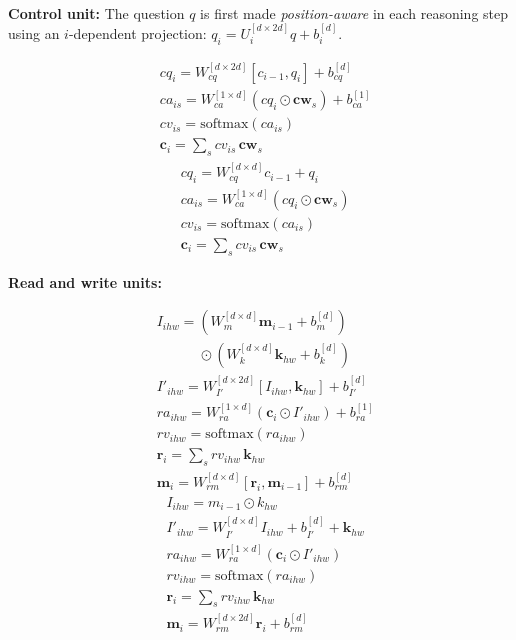 \documentclass[final,paperwidth=36in,paperheight=48in,portrait,fontscale=0.36]{baposter}
\newcommand{\cw}{\mathbf{cw}}
\newcommand{\cc}{\mathbf{c}}
\newcommand{\kb}{\mathbf{k}}
\newcommand{\mem}{\mathbf{m}}
\newcommand{\rr}{\mathbf{r}}
\begin{document}
\begin{poster}
{\\
\noindent\textbf{Control unit:} The question $q$ is first made \emph{position-aware} in each reasoning step using an $i$-dependent projection: $q_i = U_i^{[d \times 2d]} q + b_i^{[d]}$.


\begin{multicols}{2}
	\noindent
	\begin{align*}
	&cq_i = W_{cq}^{[d \times 2d]} [c_{i-1}, q_i] + b_{cq}^{[d]}  \tag{c1} \\
	&ca_{is} = W_{ca}^{[1 \times d]} (cq_i \odot \cw_s) + b_{ca}^{[1]}
	\tag{c2.1}\\
	&cv_{is} = \textrm{softmax}(ca_{is}) \tag{c2.2}\\
	&\cc_i = \sum_s cv_{is} \, \cw_s  \tag{c2.3}
	\end{align*}
	\columnbreak
	{
		\begin{align*}
		&cq_i = W_{cq}^{[d \times d]} c_{i-1} + q_i  \tag{c1} \\
		&ca_{is} = W_{ca}^{[1 \times d]} (cq_i \odot \cw_s)  \tag{c2.1}\\
		&cv_{is} = \textrm{softmax}(ca_{is}) \tag{c2.2}\\
		&\cc_i = \sum_s cv_{is} \, \cw_s  \tag{c2.3}
		\end{align*}}
\end{multicols}

\vskip -0.6cm

\noindent\textbf{Read and write units:}
\begin{multicols}{2}
	\noindent
	\begin{align*}
	&I_{ihw} = (W_{m}^{[d \times d]} \mem_{i-1} + b_{m}^{[d]}) \\
	& \qquad \quad \odot (W_{k}^{[d \times d]} \kb_{hw} + b_{k}^{[d]}) \tag{r1} \\
	&I'_{ihw} =  W_{I'}^{[d \times 2d]} [I_{ihw},\kb_{hw}]  + b_{I'}^{[d]}  \tag{r2} \\
	&ra_{ihw} = W_{ra}^{[1 \times d]} (\cc_i \odot I'_{ihw}) + b_{ra}^{[1]} \tag{r3.1}\\
	&rv_{ihw} = \textrm{softmax}(ra_{ihw}) \tag{r3.2}\\
	&\rr_i = \sum_s rv_{ihw} \, \kb_{hw}  \tag{r3.3}\\
	&\mem_i = W_{rm}^{[d \times d]} [\rr_i, \mem_{i-1}]  + b_{rm}^{[d]} \tag{w1}	
	\end{align*}
	\columnbreak
	{
		\begin{align*}
		&I_{ihw} = m _{i-1} \odot k _{hw} \tag{r1} \\ 
		&I'_{ihw} = W_{I'}^{[d \times d]} I_{ihw} + b_{I'}^{[d]} + \kb_{hw} \tag{r2} \\
		&ra_{ihw} = W_{ra}^{[1 \times d]} (\cc_i \odot I'_{ihw})  \tag{r3.1}\\
		&rv_{ihw} = \textrm{softmax}(ra_{ihw}) \tag{r3.2}\\
		&\rr_i = \sum_s rv_{ihw} \, \kb_{hw}  \tag{r3.3}\\
		&\mem_i = W_{rm}^{[d \times 2d]} \rr_i + b_{rm}^{[d]} \tag{w1}
		\end{align*}}
\end{multicols}
	
}
\end{poster}
\end{document}
